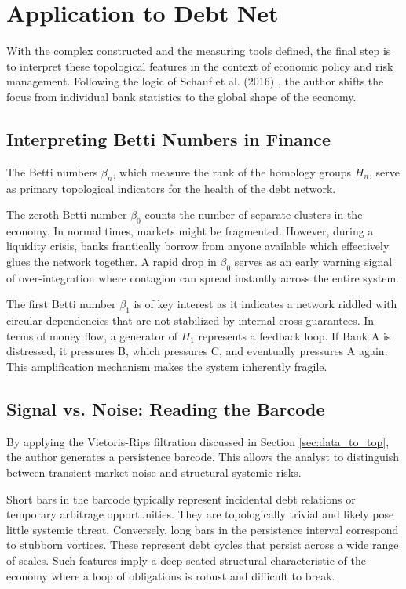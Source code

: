 \documentclass[12pt,reqno]{amsart}
\theoremstyle{definition}
\numberwithin{equation}{section}
\begin{document}
   \section{Application to Debt Net}\label{sec:application}

   With the complex constructed and the measuring tools defined, the final step is to interpret these topological features in the context of economic policy and risk management. Following the logic of Schauf et al. (2016) \cite{SCHS16}, the author shifts the focus from individual bank statistics to the global shape of the economy.

   \subsection{Interpreting Betti Numbers in Finance}
   The Betti numbers $\beta_n$, which measure the rank of the homology groups $H_n$, serve as primary topological indicators for the health of the debt network. 

   The zeroth Betti number $\beta_0$ counts the number of separate clusters in the economy. In normal times, markets might be fragmented. However, during a liquidity crisis, banks frantically borrow from anyone available which effectively glues the network together. A rapid drop in $\beta_0$ serves as an early warning signal of over-integration where contagion can spread instantly across the entire system.
    
   The first Betti number $\beta_1$ is of key interest as it indicates a network riddled with circular dependencies that are not stabilized by internal cross-guarantees. In terms of money flow, a generator of $H_1$ represents a feedback loop. If Bank A is distressed, it pressures B, which pressures C, and eventually pressures A again. This amplification mechanism makes the system inherently fragile.

   \subsection{Signal vs. Noise: Reading the Barcode}
   By applying the Vietoris-Rips filtration discussed in Section \ref{sec:data_to_top}, the author generates a persistence barcode. This allows the analyst to distinguish between transient market noise and structural systemic risks.

   Short bars in the barcode typically represent incidental debt relations or temporary arbitrage opportunities. They are topologically trivial and likely pose little systemic threat. Conversely, long bars in the persistence interval correspond to stubborn vortices. These represent debt cycles that persist across a wide range of scales. Such features imply a deep-seated structural characteristic of the economy where a loop of obligations is robust and difficult to break.
\end{document}
